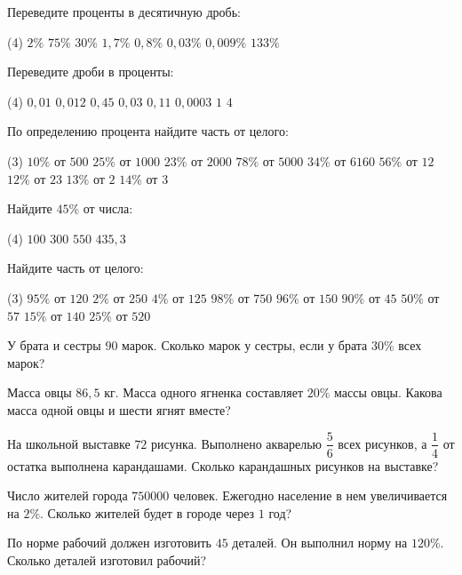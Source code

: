 \begin{class}[number=6]
	\begin{listofex}
		\item Переведите проценты в десятичную дробь: 
		\begin{tasks}(4)
			\task \( 2\% \)
			\task \( 75\% \)
			\task \( 30\% \)
			\task \( 1,7\% \)
			\task \( 0,8\% \)
			\task \( 0,03\% \)
			\task \( 0,009\% \)
			\task \( 133\% \)
		\end{tasks}
		\item Переведите дроби в проценты:
		\begin{tasks}(4)
			\task \( 0,01 \)
			\task \( 0,012 \)
			\task \( 0,45 \)
			\task \( 0,03 \)
			\task \( 0,11 \)
			\task \( 0,0003 \)
			\task \( 1 \)
			\task \( 4 \)
		\end{tasks}
		\item По определению процента найдите часть от целого: 
		\begin{tasks}(3)
			\task \( 10\%  \) от \( 500 \) 
			\task \( 25\%  \) от \( 1000 \)   
			\task \( 23\%  \) от \( 2000 \)   
			\task \( 78\%  \) от \( 5000 \)   
			\task \( 34\%  \) от \( 6160 \)   
			\task \( 56\%  \) от \( 12 \)   
			\task \( 12\%  \) от \( 23 \)   
			\task \( 13\%  \) от \( 2 \)   
			\task \( 14\%  \) от \( 3\)   
		\end{tasks}
		\item Найдите \( 45\% \) от числа:\begin{tasks}(4)
			\task \( 100 \)
			\task \( 300 \)
			\task \( 550 \)
			\task \( 435,3 \)
		\end{tasks}
		\item Найдите часть от целого: \begin{tasks}(3)
			\task \( 95\% \) от \( 120 \)
			\task \( 2\% \) от \( 250 \)
			\task \( 4\% \) от \( 125 \)
			\task \( 98\% \) от \( 750 \)
			\task \( 96\% \) от \( 150 \)
			\task \( 90\% \) от \( 45 \)
			\task \( 50\% \) от \( 57 \)
			\task \( 15\% \) от \( 140 \)
			\task \( 25\% \) от \( 520 \)
		\end{tasks} 
		
		\item У брата и сестры \( 90 \) марок. Сколько марок у сестры, если у брата \( 30\% \) всех марок?
		\item Масса овцы \( 86,5 \) кг. Масса одного ягненка составляет \( 20\% \) массы овцы. Какова масса одной овцы и шести ягнят вместе?
		\item На школьной выставке \( 72 \) рисунка. Выполнено акварелью \( \dfrac{5}{6} \) всех рисунков, а \( \dfrac{1}{4} \) от остатка выполнена карандашами. Сколько карандашных рисунков на выставке?
		\item Число жителей города \( 750 000 \) человек. Ежегодно население в нем увеличивается на \(  2\% \). Сколько жителей будет в городе через \( 1 \) год?
		\item По норме рабочий должен изготовить \( 45 \) деталей. Он выполнил норму на \( 120\% \). Сколько деталей изготовил рабочий?
	\end{listofex}
\end{class}

